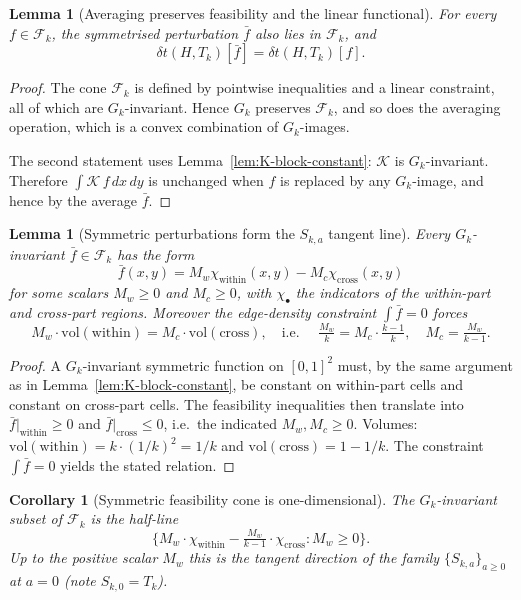 \documentclass[11pt]{amsart}
\newtheorem{lemma}[theorem]{Lemma}
\newtheorem{corollary}[theorem]{Corollary}
\theoremstyle{definition}
\newcommand{\1}{\mathbf 1}
\newcommand{\dd}{\,d}
\begin{document}
\begin{lemma}[Averaging preserves feasibility and the linear functional]
\label{lem:averaging}
For every $f\in\mathcal F_k$, the symmetrised perturbation $\bar f$ also lies in
$\mathcal F_k$, and
\[
   \delta t(H, T_k)[\bar f] = \delta t(H, T_k)[f].
\]
\end{lemma}

\begin{proof}
The cone $\mathcal F_k$ is defined by pointwise inequalities and a linear
constraint, all of which are $G_k$-invariant.  Hence $G_k$ preserves
$\mathcal F_k$, and so does the averaging operation, which is a convex
combination of $G_k$-images.

The second statement uses Lemma~\ref{lem:K-block-constant}: $\mathcal K$ is
$G_k$-invariant.  Therefore $\int \mathcal K\, f\dd x\dd y$ is unchanged when $f$
is replaced by any $G_k$-image, and hence by the average $\bar f$.
\end{proof}

\begin{lemma}[Symmetric perturbations form the $S_{k,a}$ tangent line]
\label{lem:symmetric-perturbations}
Every $G_k$-invariant $\bar f\in\mathcal F_k$ has the form
\[
   \bar f(x,y) = M_w \chi_{\mathrm{within}}(x,y) - M_c \chi_{\mathrm{cross}}(x,y)
\]
for some scalars $M_w\ge 0$ and $M_c\ge 0$, with $\chi_\bullet$ the indicators
of the within-part and cross-part regions.  Moreover the edge-density
constraint $\int \bar f = 0$ forces
\[
   M_w \cdot \mathrm{vol}(\mathrm{within}) = M_c \cdot \mathrm{vol}(\mathrm{cross}),
   \quad\text{i.e.\ }\quad
   \tfrac{M_w}{k} = M_c\cdot \tfrac{k-1}{k},
   \quad
   M_c = \tfrac{M_w}{k-1}.
\]
\end{lemma}

\begin{proof}
A $G_k$-invariant symmetric function on $[0,1]^2$ must, by the same argument as
in Lemma~\ref{lem:K-block-constant}, be constant on within-part cells and
constant on cross-part cells.  The feasibility inequalities then translate into
$\bar f|_{\mathrm{within}}\ge 0$ and $\bar f|_{\mathrm{cross}}\le 0$, i.e.\ the
indicated $M_w, M_c\ge 0$.  Volumes:
$\mathrm{vol}(\mathrm{within}) = k\cdot(1/k)^2 = 1/k$ and
$\mathrm{vol}(\mathrm{cross}) = 1 - 1/k$.  The constraint $\int \bar f = 0$
yields the stated relation.
\end{proof}

\begin{corollary}[Symmetric feasibility cone is one-dimensional]
\label{cor:1d-cone}
The $G_k$-invariant subset of $\mathcal F_k$ is the half-line
\[
   \{M_w\cdot \chi_{\mathrm{within}} - \tfrac{M_w}{k-1}\cdot\chi_{\mathrm{cross}}
   : M_w\ge 0\}.
\]
Up to the positive scalar $M_w$ this is the tangent direction of the family
$\{S_{k,a}\}_{a\ge 0}$ at $a=0$ (note $S_{k,0}=T_k$).
\end{corollary}
\end{document}
